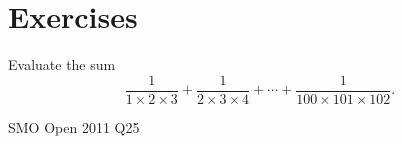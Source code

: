 \section*{Exercises}
\begin{prbm}
Evaluate the sum
\[ \frac{1}{1\times2\times3}+\frac{1}{2\times3\times4}+\cdots+\frac{1}{100\times101\times102}. \]
\end{prbm}

\begin{solution}

\end{solution}

SMO Open 2011 Q25
